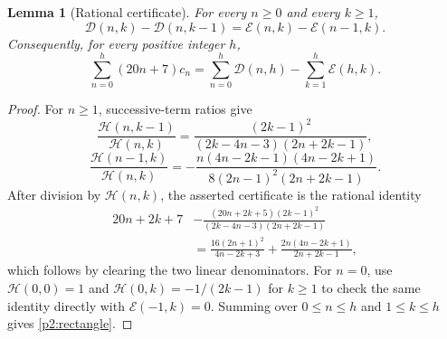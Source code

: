 \documentclass[11pt,a4paper]{article}
\newtheorem{lemma}[theorem]{Lemma}
\theoremstyle{remark}\newtheorem{remark}[theorem]{Remark}
\begin{document}
\begin{lemma}[Rational certificate]\label{p2:wz}
For every \(n\ge0\) and every \(k\ge1\),
\[
 \mathcal D(n,k)-\mathcal D(n,k-1)
      =\mathcal E(n,k)-\mathcal E(n-1,k).
\]
Consequently, for every positive integer \(h\),
\begin{equation}\label{p2:rectangle}
 \sum_{n=0}^h(20n+7)c_n
       =\sum_{n=0}^h\mathcal D(n,h)
                     -\sum_{k=1}^h\mathcal E(h,k).
\end{equation}
\end{lemma}
\begin{proof}
For \(n\ge1\), successive-term ratios give
\[
 \frac{\mathcal H(n,k-1)}{\mathcal H(n,k)}
   =\frac{(2k-1)^2}{(2k-4n-3)(2n+2k-1)},
\]
\[
 \frac{\mathcal H(n-1,k)}{\mathcal H(n,k)}
 =-\frac{n(4n-2k-1)(4n-2k+1)}
          {8(2n-1)^2(2n+2k-1)}.
\]
After division by \(\mathcal H(n,k)\), the asserted certificate is
the rational identity
\[
\begin{split}
 20n+2k+7
 &-\frac{(20n+2k+5)(2k-1)^2}
          {(2k-4n-3)(2n+2k-1)}\\
 &=\frac{16(2n+1)^2}{4n-2k+3}
       +\frac{2n(4n-2k+1)}{2n+2k-1},
\end{split}
\]
which follows by clearing the two linear denominators.
For \(n=0\), use \(\mathcal H(0,0)=1\) and
\(\mathcal H(0,k)=-1/(2k-1)\) for \(k\ge1\) to check the same
identity directly with \(\mathcal E(-1,k)=0\).
Summing over \(0\le n\le h\) and \(1\le k\le h\) gives
\eqref{p2:rectangle}.
\end{proof}
\end{document}

